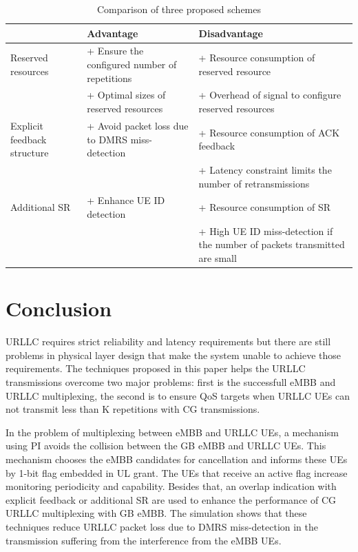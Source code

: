 \documentclass{ieeeaccess}
\begin{document}
\begin{table}[htbp]
\caption{Comparison of three proposed schemes}
\begin{center}
\begin{tabular}{|p{4em}|p{11em}|p{11em}|}
 \hline
& \textbf{Advantage}&\textbf{Disadvantage}\\
 \hline
 Reserved resources &+ Ensure the configured number of repetitions & + Resource consumption of reserved resource\\ & + Optimal sizes of reserved resources &+ Overhead of signal to configure reserved resources\\
 \hline
  Explicit feedback structure& + Avoid packet loss due to DMRS miss-detection&+ Resource consumption of ACK feedback\\& &+ Latency constraint limits the number of retransmissions\\
 \hline
Additional SR&+ Enhance UE ID detection&+ Resource consumption of SR\\& &  + High UE ID miss-detection if the number of packets transmitted are small\\

 
 \hline
\end{tabular}
\label{tab9}
\end{center}
\vspace{-6mm}
\end{table}

\section{Conclusion}

URLLC requires strict reliability and latency requirements but there are still problems in physical layer design that make the system unable to achieve those requirements. The techniques proposed in this paper helps the URLLC transmissions overcome two major problems: first is the successfull eMBB and URLLC multiplexing, the second is to ensure QoS targets when URLLC UEs can not transmit less than K repetitions with CG transmissions. 

In the problem of multiplexing between eMBB and URLLC UEs, a mechanism using PI avoids the collision between the GB eMBB and URLLC UEs. This mechanism chooses the eMBB candidates for cancellation and informs these UEs by 1-bit flag embedded in UL grant. The UEs that receive an active flag increase monitoring periodicity and capability. Besides that, an overlap indication with explicit feedback or additional SR are used to enhance the performance of CG URLLC multiplexing with GB eMBB. The simulation shows that these techniques reduce URLLC packet loss due to DMRS miss-detection in the transmission suffering from the interference from the eMBB UEs. 
\end{document}
